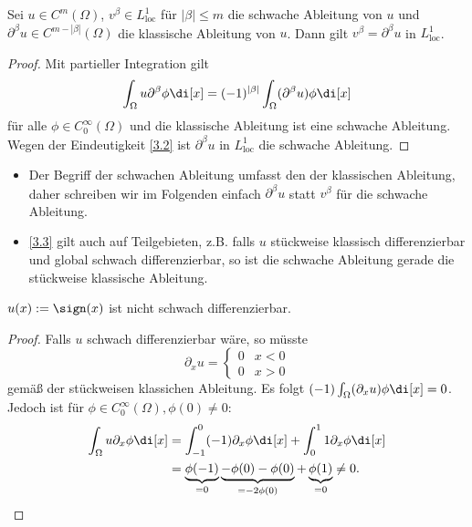 \begin{st} \label{3.3}
	Sei $u \in C^m(\Omega)$, $v^\beta \in L^1_{\text{loc}}$ für $|\beta| \le m$ die schwache Ableitung von $u$ und $\partial^\beta u \in C^{m-|\beta|}(\Omega)$ die klassische Ableitung von $u$.
	Dann gilt $v^\beta = \partial^\beta u$ in $L^1_{\text{loc}}$.
	\begin{proof}
		Mit partieller Integration gilt
		\[
			\int_\Omega u \partial^\beta \phi \di[x]
			= (-1)^{|\beta|} \int_\Omega (\partial^\beta u) \phi \di[x]
		\]
		für alle $\phi \in C_0^\infty(\Omega)$ und die klassische Ableitung ist eine schwache Ableitung.
		Wegen der Eindeutigkeit \ref{3.2} ist $\partial^\beta u$ in $L^1_{\text{loc}}$ die schwache Ableitung.
	\end{proof}
	\begin{note}
		\begin{itemize}
			\item
				Der Begriff der schwachen Ableitung umfasst den der klassischen Ableitung, daher schreiben wir im Folgenden einfach $\partial^\beta u$ statt $v^\beta$ für die schwache Ableitung.
			\item
				\ref{3.3} gilt auch auf Teilgebieten, z.B. falls $u$ stückweise klassisch differenzierbar und global schwach differenzierbar, so ist die schwache Ableitung gerade die stückweise klassische Ableitung.
		\end{itemize}
	\end{note}
\end{st}

\begin{ex*}
	$u(x) := \sign(x)$ ist nicht schwach differenzierbar.
	\begin{proof}
		Falls $u$ schwach differenzierbar wäre, so müsste
		\[
			\partial_x u = \begin{cases}
				0 & x < 0 \\
				0 & x > 0
			\end{cases}
		\]
		gemäß der stückweisen klassichen Ableitung.
		Es folgt $(-1)\int_\Omega (\partial_x u) \phi \di[x] = 0$.
		Jedoch ist für $\phi \in C_0^\infty(\Omega), \phi(0) \neq 0$:
		\begin{align*}
			\int_\Omega u \partial_x \phi \di[x]
			&= \int_{-1}^0 (-1) \partial_x \phi \di[x] + \int_0^1 1 \partial_x \phi \di[x] \\
			&= \underbrace{\phi(-1)}_{=0} \underbrace{- \phi(0) - \phi(0)}_{= -2 \phi(0)} + \underbrace{\phi(1) }_{=0}
			\neq 0.
		\end{align*}
	\end{proof}
\end{ex*}

